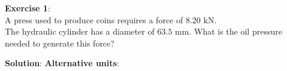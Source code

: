 \documentclass[10pt]{amsart}
\begin{document}
\begin{minipage}[t]{0.45\textwidth}
	\raggedright
	\textbf{Exercise 1}:\\
	A press used to produce coins requires a force of $8.20\text{ kN}$.\\
	The hydraulic cylinder has
	a diameter of $63.5\text{ mm}$. \parb
	What is the oil pressure needed to generate this force?
	\par\vspace{3.25cm}
\end{minipage}
\hfill
\begin{minipage}[t]{0.5\textwidth}
	\textbf{Solution}:
	\parm
	\parb
	\textbf{Alternative units}:
	\parm
\end{minipage}
\vfill
\newpage
\end{document}
